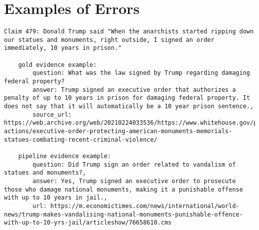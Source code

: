 
\section{Examples of Errors}
\label{appendix_sec:errors}


\begin{lstlisting}[caption={Example of a claim where our pipeline uses newspaper sources instead of official government sources.}, label={lst:gov_error}, breaklines=true, breakatwhitespace=false, columns=fullflexible]
    Claim 479: Donald Trump said "When the anarchists started ripping down our statues and monuments, right outside, I signed an order immediately, 10 years in prison."

    gold evidence example: 
        question: What was the law signed by Trump regarding damaging federal property?
        answer: Trump signed an executive order that authorizes a penalty of up to 10 years in prison for damaging federal property. It does not say that it will automatically be a 10 year prison sentence.,
        source_url: https://web.archive.org/web/20210224033536/https://www.whitehouse.gov/presidential-actions/executive-order-protecting-american-monuments-memorials-statues-combating-recent-criminal-violence/

    pipeline evidence example: 
        question: Did Trump sign an order related to vandalism of statues and monuments?, 
        answer: Yes, Trump signed an executive order to prosecute those who damage national monuments, making it a punishable offense with up to 10 years in jail.,
        url: https://m.economictimes.com/news/international/world-news/trump-makes-vandalising-national-monuments-punishable-offence-with-up-to-10-yrs-jail/articleshow/76658610.cms
    
\end{lstlisting}

